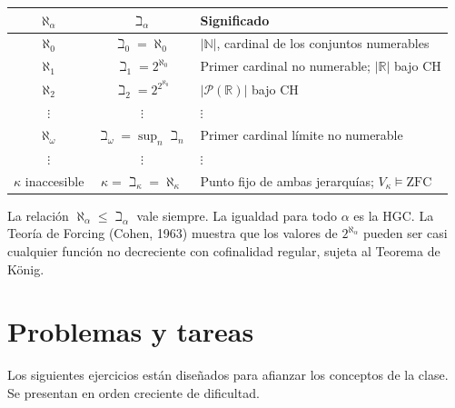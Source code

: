 \begin{center}
\renewcommand{\arraystretch}{1.5}
\begin{tabular}{c|c|l}
$\aleph_\alpha$ & $\beth_\alpha$ & Significado \\ \hline
$\aleph_0$ & $\beth_0 = \aleph_0$ & $|\mathbb{N}|$, cardinal de los conjuntos numerables \\
$\aleph_1$ & $\beth_1 = 2^{\aleph_0}$ & Primer cardinal no numerable; $|\mathbb{R}|$ bajo CH \\
$\aleph_2$ & $\beth_2 = 2^{2^{\aleph_0}}$ & $|\mathcal{P}(\mathbb{R})|$ bajo CH \\
$\vdots$ & $\vdots$ & $\vdots$ \\
$\aleph_\omega$ & $\beth_\omega = \sup_n \beth_n$ & Primer cardinal límite no numerable \\
$\vdots$ & $\vdots$ & $\vdots$ \\
$\kappa$ inaccesible & $\kappa = \beth_\kappa = \aleph_\kappa$ & Punto fijo de ambas jerarquías; $V_\kappa \models \mathrm{ZFC}$
\end{tabular}
\end{center}

\begin{importante}
La relación $\aleph_\alpha \leq \beth_\alpha$ vale siempre. La igualdad para todo $\alpha$ es la HGC. La Teoría de Forcing (Cohen, 1963) muestra que los valores de $2^{\aleph_\alpha}$ pueden ser casi cualquier función no decreciente con cofinalidad regular, sujeta al Teorema de König.
\end{importante}

\section{Problemas y tareas}

Los siguientes ejercicios están diseñados para afianzar los conceptos de la clase. Se presentan en orden creciente de dificultad.

